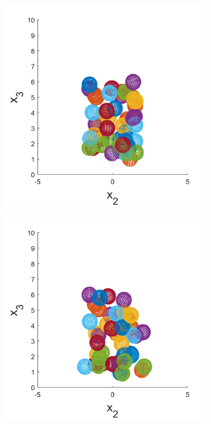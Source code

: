 \begin{figure}
\centering
\begin{subfigure}[b]{0.24\textwidth}
    \centering
    \includegraphics[width=\textwidth]{Images/squirmers/Gyro-1-All.pdf}
    \caption[]{\label{fig:squirmerPosA}}
\end{subfigure}
\begin{subfigure}[b]{0.24\textwidth}
    \centering
    \includegraphics[width=\textwidth]{Images/squirmers/Gyro-2-All.pdf}

\end{subfigure}
\end{figure}
